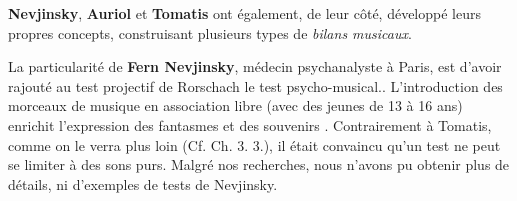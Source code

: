 


        \textbf{Nevjinsky}\autocite{nevjinsky:adolescence},\textbf{ Auriol}\autocite{auriol:cle}
      et \textbf{Tomatis} \autocite {tomatisoreilletvie} ont également, de leur côté, développé leurs propres
                   concepts, construisant plusieurs types de \emph{bilans musicaux}.

La particularité de \textbf{Fern Nevjinsky}, médecin psychanalyste à
  Paris, est d'avoir rajouté au test projectif de Rorschach le test psycho-musical.\autocite{nevjinsky:adolescence}.
L'introduction des morceaux de musique en association libre (avec
 des jeunes de 13 à 16 ans) enrichit l'expression des fantasmes et des
 souvenirs \autocite{nevjinsky:adolescence}. %
Contrairement à Tomatis, comme on le verra plus loin (Cf. Ch. 3. 3.), il était convaincu qu'un test ne peut se limiter à des sons purs. Malgré nos recherches, nous n'avons pu obtenir plus de détails, ni d'exemples de tests de Nevjinsky.



